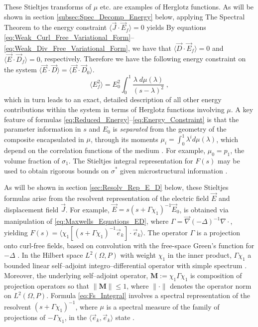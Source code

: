 \documentclass[english,12pt,jmp,graphicx]{revtex4-1}
\begin{document}
These Stieltjes transforms of $\mu$ etc. are examples of
Herglotz functions. As will be shown in section
\ref{subsec:Spec_Decomp_Energy} below, applying The Spectral Theorem
\cite{Reed-1980} to the energy constraint  $\langle\vec{J}\cdot\vec{E}_f \rangle=0$
yields
By equations
\eqref{eq:Weak_Curl_Free_Variational_Form}--\eqref{eq:Weak_Div_Free_Variational_Form},
we have that $\langle\vec{D}\cdot\vec{E}_f\rangle=0$ and $\langle\vec{E}\cdot\vec{D}_f\rangle=0$,
respectively. Therefore we have the following energy constraint on the
system $\langle\vec{E}\cdot\vec{D}\rangle =\langle\vec{E}\cdot\vec{D}_0\rangle$. 
% 
\begin{equation} \label{eq:Energy_Constraint}
	\langle E_f^2\rangle=E_0^2\int_0^1\frac{\lambda \; d\mu(\lambda)}{(s-\lambda)^2}\;, 
\end{equation}
% 
which in turn leads to an exact, detailed description of all other
energy contributions within the system in terms of Herglotz functions
involving $\mu$. A key feature of formulas
\eqref{eq:Reduced_Energy}--\eqref{eq:Energy_Constraint}
is that the parameter information in $s$ 
and $E_0$ is {\it separated} from the geometry of the composite
encapsulated in $\mu$, through its moments $\mu_i=\int_0^1 \lambda^i d\mu(\lambda)$, which
depend on the correlation functions of the medium
\cite{Golden:CMP-473}. For example, $\mu_0=p_1$, the volume fraction of
$\sigma_1$. The Stieltjes integral representation for $F(s)$ may be used to
obtain rigorous bounds on $\sigma^*$ given microstructural information 
\cite{Bergman:PRL-1285,Milton:APL-300,Golden:CMP-473,Bergman:AP-78}. 

As will be shown in section \ref{sec:Resolv_Rep_E_D} below, these
Stieltjes formulas arise from the resolvent representation of the
electric field $\vec{E}$ and displacement field $\vec{J}$. For
example, $\vec{E} = s(s + \Gamma \chi_1)^{-1}\vec{E}_0$, is obtained via
manipulation of \eqref{eq:Maxwells_Equations_ED}, where $\Gamma=\vec{\nabla}(-\Delta)^{-1}\nabla\cdot$,
yielding $F(s)=\langle\chi_1[(s+\Gamma\chi_1)^{-1}\vec{e}_k]\cdot\vec{e}_k \rangle$. The operator
$\Gamma$ is a projection onto curl-free fields, based on convolution with
the free-space Green's function for $-\Delta$ \cite{Golden:CMP-473}. In the
Hilbert space $L^2(\Omega,P)$ with weight $\chi_1$ in the inner product,
$\Gamma\chi_1$ a bounded linear self--adjoint integro--differential operator
with simple spectrum \cite{Golden:CMP-473}. Moreover, the
underlying self--adjoint operator, $\mathbf{M}:=\chi_1\Gamma\chi_1$ is
composition of projection operators so that $\|\mathbf{M}\|\leq1$, where
$\|\cdot\|$ denotes the operator norm on $L^2(\Omega,P)$. Formula
\eqref{eq:Fs_Integral} involves a spectral representation of the
resolvent $(s+\Gamma\chi_1)^{-1}$, where $\mu$ is a spectral measure of the
family of projections of $-\Gamma\chi_1$, in the $\langle\vec{e}_k,\vec{e}_k\rangle$ state
\cite{Golden:CMP-473,Reed-1980}.
\end{document}
